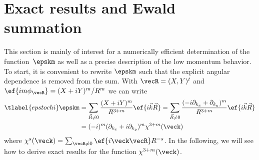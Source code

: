 %

\section{Exact results and Ewald summation}
\label{ewald}
This section is mainly of interest for a numerically efficient determination of the function~$\epskm$ as well as a precise description of the low momentum behavior.
To start, it is convenient to rewrite $\epskm$ such that the explicit angular dependence is removed from the sum. With $\vecR = (X, Y)^t$ and $\ef{im\phi_\vecR} = (X+iY)^m/R^m$ we can write
\begin{align} \tlabel{epstochi}
    \epskm
    &= \sum_{\vec{R}\ne 0} \frac{(X+i Y)^m}{R^{3+m}}\ef{i\vec{k}\vec{R}}
    = \sum_{\vec{R}\ne 0} \frac{(-i \partial_{k_x}+ \partial_{k_y})^m}{R^{3+m}} \ef{i\vec{k}\vec{R}} \\
    &= (-i)^m (\partial_{k_x}+ i \partial_{k_y})^m \chi^{3+m}(\veck)
\end{align}
where $\chi^s(\veck) = \sum_{\vecR\ne 0} \ef{i \veck \vecR} R^{-s}$.
In the following, we will see how to derive exact results for the function $\chi^{3+m}(\veck)$.

